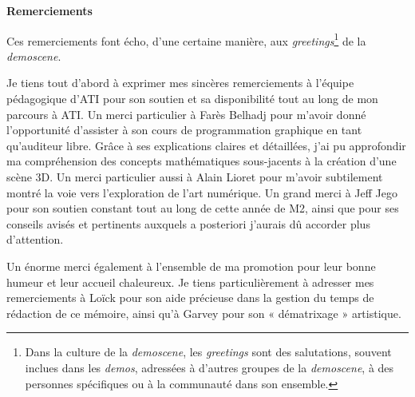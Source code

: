 \begin{titlepage}
    \begin{minipage}[t][\textheight]{\textwidth}
        \vspace*{\fill}
        \begin{flushleft}         
            \Huge\textbf{Remerciements}
        \end{flushleft}
        \vspace{1cm}
        \begin{flushleft}

            Ces remerciements font écho, d'une certaine manière, aux \textit{greetings}\footnote{Dans la culture de la \textit{demoscene}, les \textit{greetings} sont des salutations, souvent inclues dans les \textit{demos}, adressées à d'autres groupes de la \textit{demoscene}, à des personnes spécifiques ou à la communauté dans son ensemble.} de la \textit{demoscene}.
            
            Je tiens tout d'abord à exprimer mes sincères remerciements à l'équipe pédagogique d'ATI pour son soutien et sa disponibilité tout au long de mon parcours à ATI. Un merci particulier à Farès Belhadj pour m'avoir donné l'opportunité d'assister à son cours de programmation graphique en tant qu'auditeur libre. Grâce à ses explications claires et détaillées, j'ai pu approfondir ma compréhension des concepts mathématiques sous-jacents à la création d'une scène 3D. Un merci particulier aussi à Alain Lioret pour m'avoir subtilement montré la voie vers l'exploration de l'art numérique. Un grand merci à Jeff Jego pour son soutien constant tout au long de cette année de M2, ainsi que pour ses conseils avisés et pertinents auxquels a posteriori j'aurais dû accorder plus d'attention.
            
            
            Un énorme merci également à l'ensemble de ma promotion pour leur bonne humeur et leur accueil chaleureux. Je tiens particulièrement à adresser mes remerciements à Loïck pour son aide précieuse dans la gestion du temps de rédaction de ce mémoire, ainsi qu'à Garvey pour son « dématrixage » artistique.
            

\end{flushleft}
\end{minipage}
\end{titlepage}
